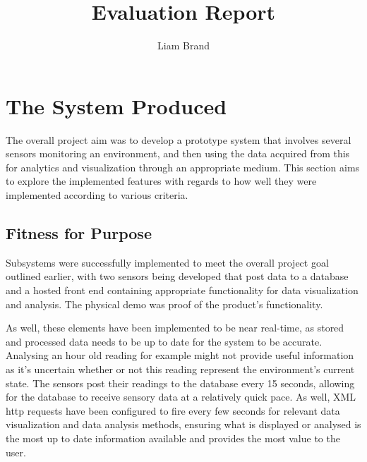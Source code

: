 \documentclass[]{report}
\title{Evaluation Report}
\author{Liam Brand}
\date{}
\begin{document}
\maketitle

\section{The System Produced}
The overall project aim was to develop a prototype system that involves several sensors monitoring an environment, and then using the data acquired from this for analytics and visualization through an appropriate medium. This section aims to explore the implemented features with regards to how well they were implemented according to various criteria.

	\subsection{Fitness for Purpose}
	Subsystems were successfully implemented to meet the overall project goal outlined earlier, with two sensors being developed that post data to a database and a hosted front end containing appropriate functionality for data visualization and analysis. The physical demo was proof of the product's functionality.
	
	As well, these elements have been implemented to be near real-time, as stored and processed data needs to be up to date for the system to be accurate. Analysing an hour old reading for example might not provide useful information as it's uncertain whether or not this reading represent the environment's current state. The sensors post their readings to the database every 15 seconds, allowing for the database to receive sensory data at a relatively quick pace. As well, XML http requests have been configured to fire every few seconds for relevant data visualization and data analysis methods, ensuring what is displayed or analysed is the most up to date information available and provides the most value to the user.
	
\end{document}
